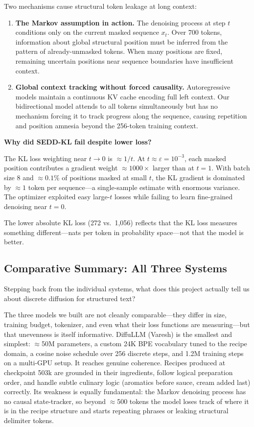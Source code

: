\documentclass[11pt,a4paper]{article}
\begin{document}
Two mechanisms cause structural token leakage at long context:
\begin{enumerate}[nosep]
  \item \textbf{The Markov assumption in action.} The denoising process at step $t$ conditions only on the current masked sequence $x_t$. Over 700 tokens, information about global structural position must be inferred from the pattern of already-unmasked tokens. When many positions are fixed, remaining uncertain positions near sequence boundaries have insufficient context.
  \item \textbf{Global context tracking without forced causality.} Autoregressive models maintain a continuous KV cache encoding full left context. Our bidirectional model attends to all tokens simultaneously but has no mechanism forcing it to track progress along the sequence, causing repetition and position amnesia beyond the 256-token training context.
\end{enumerate}

\textbf{Why did SEDD-KL fail despite lower loss?}

The KL loss weighting near $t \to 0$ is $\approx 1/t$. At $t \approx \varepsilon = 10^{-3}$, each masked position contributes a gradient weight $\approx 1000\times$ larger than at $t = 1$. With batch size 8 and $\approx 0.1\%$ of positions masked at small $t$, the KL gradient is dominated by $\approx 1$ token per sequence---a single-sample estimate with enormous variance. The optimizer exploited easy large-$t$ losses while failing to learn fine-grained denoising near $t = 0$.

The lower absolute KL loss (272 vs.\ 1,056) reflects that the KL loss measures something different---nats per token in probability space---not that the model is better.

\subsection{Comparative Summary: All Three Systems}

Stepping back from the individual systems, what does this project actually tell us about discrete diffusion for structured text?

The three models we built are not cleanly comparable---they differ in size, training budget, tokenizer, and even what their loss functions are measuring---but that unevenness is itself informative. DiffuLLM (Varesh) is the smallest and simplest: $\approx$50M parameters, a custom 24K BPE vocabulary tuned to the recipe domain, a cosine noise schedule over 256 discrete steps, and 1.2M training steps on a multi-GPU setup. It reaches genuine coherence. Recipes produced at checkpoint 503k are grounded in their ingredients, follow logical preparation order, and handle subtle culinary logic (aromatics before sauce, cream added last) correctly. Its weakness is equally fundamental: the Markov denoising process has no causal state-tracker, so beyond $\approx$500 tokens the model loses track of where it is in the recipe structure and starts repeating phrases or leaking structural delimiter tokens.
\end{document}
